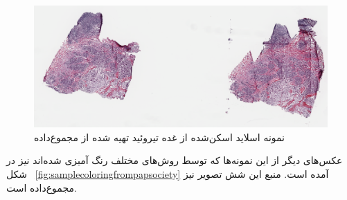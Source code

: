 \begin{figure}
    \begin{center}
        \includegraphics[width=\linewidth]{figs/basic_concepts/subs/Sample Slide From NCI.PNG}
    \end{center}
    \caption[نمونه اسلاید اسکن‌شده از غده تیروئید]{نمونه اسلاید اسکن‌شده از غده تیروئید تهیه شده از مجموع‌داده \cite{ncigdc} }
    \label{fig:sampleWSIscan}
\end{figure}
عکس‌های دیگر از این نمونه‌ها که توسط روش‌های مختلف رنگ آمیزی شده‌اند نیز در شکل ~\autoref{fig:samplecoloringfrompapsociety} آمده است.
منبع این شش تصویر نیز مجموع‌داده \cite{papsocietyiamgeatlas} است.
